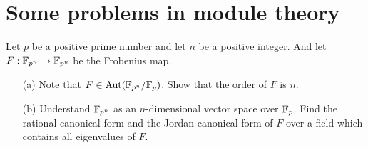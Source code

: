 \section{Some problems in module theory}

\begin{prob}
    Let $p$ be a positive prime number and let $n$ be a positive integer.
    And let $F: {\mathbb{F}}_{p^n}\rightarrow{\mathbb{F}}_{p^n}$ be the Frobenius map.
    \begin{enumerate}
        \item[(a)]
        {
            Note that $F\in{\textrm{Aut}({{\mathbb{F}}_{p^n}/{\mathbb{F}}_p})}$.
            Show that the order of $F$ is $n$.
        }
        \item[(b)]
        {
            Understand ${\mathbb{F}}_{p^n}$ as an $n$-dimensional vector space over ${\mathbb{F}}_p$.
            Find the rational canonical form and the Jordan canonical form of $F$ over a field which contains all eigenvalues of $F$.
        }
    \end{enumerate}
\end{prob}
